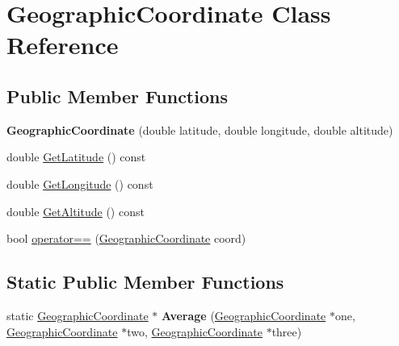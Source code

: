 \hypertarget{class_geographic_coordinate}{}\section{Geographic\+Coordinate Class Reference}
\label{class_geographic_coordinate}
\subsection*{Public Member Functions}
\begin{DoxyCompactItemize}
\item 
\hypertarget{class_geographic_coordinate_a1390469d68e224c150d9a2fe525ea12d}{}{\bfseries Geographic\+Coordinate} (double latitude, double longitude, double altitude)\label{class_geographic_coordinate_a1390469d68e224c150d9a2fe525ea12d}

\item 
double \hyperlink{class_geographic_coordinate_abbc98e8088d75c9eeb4d5729af9e2134}{Get\+Latitude} () const 
\item 
double \hyperlink{class_geographic_coordinate_a3fdeba79b64be354cf0b5e0f4eae1ab6}{Get\+Longitude} () const 
\item 
double \hyperlink{class_geographic_coordinate_a8e81c61457ef1fa986ec3d4b66632ee3}{Get\+Altitude} () const 
\item 
bool \hyperlink{class_geographic_coordinate_a996b26db85906eff5c7325fe740dc043}{operator==} (\hyperlink{class_geographic_coordinate}{Geographic\+Coordinate} coord)
\end{DoxyCompactItemize}
\subsection*{Static Public Member Functions}
\begin{DoxyCompactItemize}
\item 
\hypertarget{class_geographic_coordinate_adcc04fda5defc24bc2499d32dadf6133}{}static \hyperlink{class_geographic_coordinate}{Geographic\+Coordinate} $\ast$ {\bfseries Average} (\hyperlink{class_geographic_coordinate}{Geographic\+Coordinate} $\ast$one, \hyperlink{class_geographic_coordinate}{Geographic\+Coordinate} $\ast$two, \hyperlink{class_geographic_coordinate}{Geographic\+Coordinate} $\ast$three)\label{class_geographic_coordinate_adcc04fda5defc24bc2499d32dadf6133}

\end{DoxyCompactItemize}


